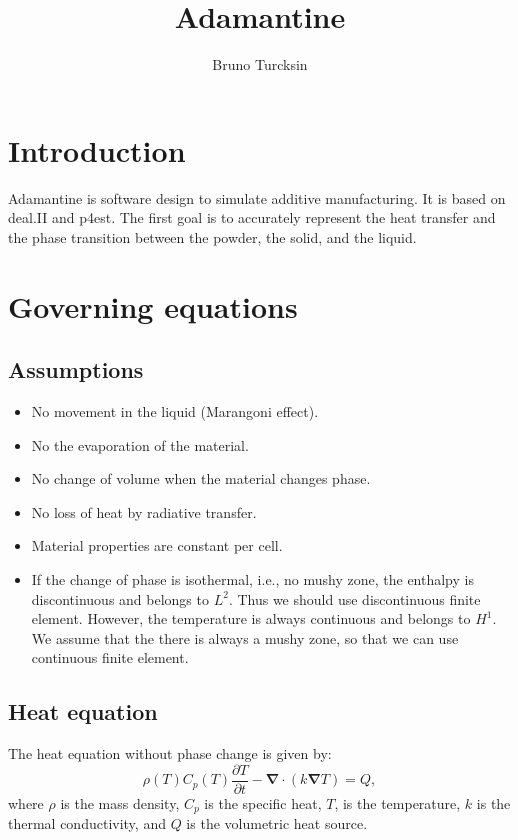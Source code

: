 \documentclass[letterpaper]{article}
\newcommand\bn{\boldsymbol{\nabla}}
\renewcommand{\(}{\left(}
\renewcommand{\)}{\right)}
\renewcommand{\[}{\left[}
\renewcommand{\]}{\right]}
\begin{document}
\title{Adamantine}
\author{Bruno Turcksin} 
\date{}
\maketitle

\section{Introduction}
Adamantine is software design to simulate additive manufacturing. It is based on
deal.II and p4est. The first goal is to accurately represent the heat transfer
and the phase transition between the powder, the solid, and the liquid.

\section{Governing equations}
\subsection{Assumptions}
\begin{itemize}
  \item No movement in the liquid (Marangoni effect).
  \item No the evaporation of the material.
  \item No change of volume when the material changes phase.
  \item No loss of heat by radiative transfer.
  \item Material properties are constant per cell.
  \item If the change of phase is isothermal, i.e., no mushy zone, the enthalpy
    is discontinuous and belongs to $L^2$. Thus we should use discontinuous
    finite element. However, the temperature is always continuous and belongs to
    $H^1$. We assume that the there is always a mushy zone, so that we can use
    continuous finite element.
\end{itemize}
\subsection{Heat equation}
The heat equation without phase change is given by:
\begin{equation}
  \rho(T) C_p(T) \frac{\partial T}{\partial t} - \bn \cdot \(k\bn T\) = Q,
\end{equation}
where $\rho$ is the mass density, $C_p$ is the specific heat, $T$, is the
temperature, $k$ is the thermal conductivity, and $Q$ is the volumetric heat
source.
\end{document}
